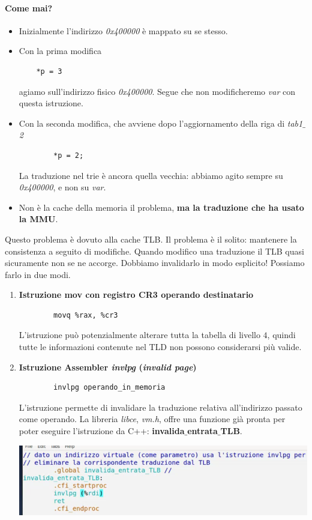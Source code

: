 \documentclass[11pt]{report}
\theoremstyle{definition}
\begin{document}
\paragraph{Come mai?} 
\begin{itemize}
	\item Inizialmente l'indirizzo \emph{0x400000} è mappato su se stesso. 
	\item Con la prima modifica
	\begin{verbatim}
	*p = 3
	\end{verbatim}
	agiamo sull'indirizzo fisico \emph{0x400000}. Segue che non modificheremo \emph{var} con questa istruzione.
	\item Con la seconda modifica, che avviene dopo l'aggiornamento della riga di \emph{tab1$\_$2}
	\begin{verbatim}
		*p = 2;
	\end{verbatim} La traduzione nel trie è ancora quella vecchia: abbiamo agito sempre su \emph{0x400000}, e non su \emph{var}.
	\item Non è la cache della memoria il problema, \textbf{ma la traduzione che ha usato la MMU}.
\end{itemize}
Questo problema è dovuto alla cache TLB. Il problema è il solito: mantenere la consistenza a seguito di modifiche. Quando modifico una traduzione il TLB quasi sicuramente non se ne accorge. Dobbiamo invalidarlo in modo esplicito! Possiamo farlo in due modi.
\begin{enumerate}
	\item \textbf{Istruzione mov con registro CR3 operando destinatario}
	\begin{verbatim}
		movq %rax, %cr3
	\end{verbatim}
	L'istruzione può potenzialmente alterare tutta la tabella di livello $4$, quindi tutte le informazioni contenute nel TLD non possono considerarsi più valide. 
	\item \textbf{Istruzione Assembler \emph{invlpg} (\emph{invalid page})}
	\begin{verbatim}
		invlpg operando_in_memoria
	\end{verbatim}
	L'istruzione permette di invalidare la traduzione relativa all'indirizzo passato come operando. La libreria \emph{libce},  \emph{vm.h}, offre una funzione già pronta per poter eseguire l'istruzione da C++: \textbf{invalida$\_$entrata$\_$TLB}.
	\begin{center}
		\includegraphics[scale=.8]{img/235.PNG}
	\end{center} 
\end{enumerate}
\end{document}
